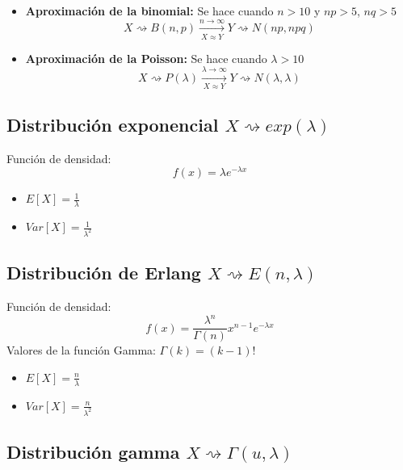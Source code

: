 \documentclass[11pt,twoside,titlepage,a4paper]{article}
\theoremstyle{definition}
\theoremstyle{plain_rojo}
\theoremstyle{remark}
\begin{document}
\begin{itemize}[font={\color{rojooscuro}\bfseries}]
	\item \textbf{Aproximación de la binomial: } Se hace cuando $n>10$ y $np>5$, $nq>5$
	$$X\rightsquigarrow B(n,p)\xrightarrow[X\approx Y]{n\to\infty} Y\rightsquigarrow N(np,npq)$$
	\item \textbf{Aproximación de la Poisson: } Se hace cuando $\lambda>10$
	$$X\rightsquigarrow P(\lambda)\xrightarrow[X\approx Y]{\lambda\to\infty} Y\rightsquigarrow N(\lambda,\lambda)$$
\end{itemize}

\subsection{Distribución exponencial $X\rightsquigarrow exp(\lambda)$}

Función de densidad:
\begin{equation*}
f(x)=\lambda e^{-\lambda x}
\end{equation*}
\begin{multicols}{2}
	\begin{itemize}[label={}]
		\item $E[X]=\displaystyle\frac 1\lambda$
		\item $Var[X]=\displaystyle\frac{1}{\lambda^2}$
	\end{itemize}
\end{multicols}

\subsection{Distribución de Erlang $X\rightsquigarrow E(n,\lambda)$}

Función de densidad:
\begin{equation*}
f(x)=\frac{\lambda^n}{\Gamma(n)}x^{n-1}e^{-\lambda x}
\end{equation*}
Valores de la función Gamma: $\Gamma(k)=(k-1)!$
\begin{multicols}{2}
	\begin{itemize}[label={}]
		\item $E[X]=\displaystyle\frac n\lambda$
		\item $Var[X]=\displaystyle\frac{n}{\lambda^2}$
	\end{itemize}
\end{multicols}

\subsection{Distribución gamma $X\rightsquigarrow \Gamma(u,\lambda)$}
\end{document}

